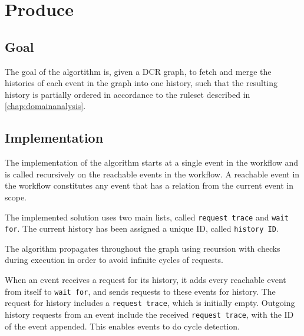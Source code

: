\section{Produce}
\subsection{Goal} %
The goal of the algortithm is, given a DCR graph, to fetch and merge the histories of each event in the graph into one history, such that the resulting history is partially ordered in accordance to the ruleset described in \ref{chap:domainanalysis}. 


\subsection{Implementation} %
The implementation of the algorithm starts at a single event in the workflow and is called recursively on the reachable events in the workflow. A reachable event in the workflow constitutes any event that has a relation from the current event in scope.  \bigskip

The implemented solution uses two main lists, called \texttt{request trace} and \texttt{wait for}. The current history has been assigned a unique ID, called \texttt{history ID}.

The algorithm propagates throughout the graph using recursion with checks during execution in order to avoid infinite cycles of requests. \bigskip

When an event receives a request for its history, it adds every reachable event from itself to \texttt{wait for}, and sends requests to these events for history. The request for history includes a \texttt{request trace}, which is initially empty. Outgoing history requests from an event include the received \texttt{request trace}, with the ID of the event appended. This enables events to do cycle detection. \bigskip

